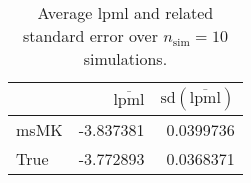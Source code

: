 \begin{table}[H]

\caption{Average lpml and related standard error over $n_{\text{sim}} = 10$ simulations.}
\centering
\begin{tabular}[t]{lrr}
\toprule
  & $\overbar{\text{lpml}}$ & $\text{sd}(\overbar{\text{lpml}})$\\
\midrule
msMK & -3.837381 & 0.0399736\\
True & -3.772893 & 0.0368371\\
\bottomrule
\end{tabular}
\end{table}